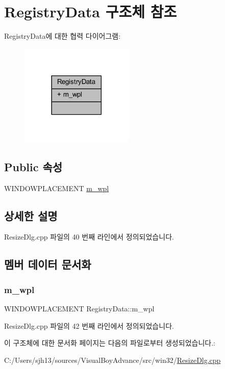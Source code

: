 \hypertarget{struct_registry_data}{}\section{Registry\+Data 구조체 참조}
\label{struct_registry_data}


Registry\+Data에 대한 협력 다이어그램\+:\nopagebreak
\begin{figure}[H]
\begin{center}
\leavevmode
\includegraphics[width=153pt]{struct_registry_data__coll__graph}
\end{center}
\end{figure}
\subsection*{Public 속성}
\begin{DoxyCompactItemize}
\item 
W\+I\+N\+D\+O\+W\+P\+L\+A\+C\+E\+M\+E\+NT \mbox{\hyperlink{struct_registry_data_a8635a0973196376667281ae2ae52e6be}{m\+\_\+wpl}}
\end{DoxyCompactItemize}


\subsection{상세한 설명}


Resize\+Dlg.\+cpp 파일의 40 번째 라인에서 정의되었습니다.



\subsection{멤버 데이터 문서화}
\mbox{\label{struct_registry_data_a8635a0973196376667281ae2ae52e6be}} 
\subsubsection{\texorpdfstring{m\+\_\+wpl}{m\_wpl}}
{\footnotesize\ttfamily W\+I\+N\+D\+O\+W\+P\+L\+A\+C\+E\+M\+E\+NT Registry\+Data\+::m\+\_\+wpl}



Resize\+Dlg.\+cpp 파일의 42 번째 라인에서 정의되었습니다.



이 구조체에 대한 문서화 페이지는 다음의 파일로부터 생성되었습니다.\+:\begin{DoxyCompactItemize}
\item 
C\+:/\+Users/sjh13/sources/\+Visual\+Boy\+Advance/src/win32/\mbox{\hyperlink{_resize_dlg_8cpp}{Resize\+Dlg.\+cpp}}\end{DoxyCompactItemize}
